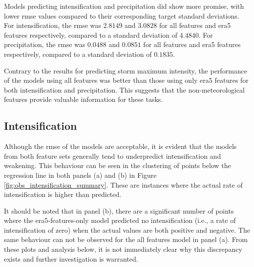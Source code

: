 Models predicting intensification and precipitation did show more promise, with lower \acrshort{rmse} values compared to their corresponding target standard deviations. For intensification, the \acrshort{rmse} was $2.8149$ and $3.0828$ for all features and \acrshort{era5} features respectively, compared to a standard deviation of $4.4840$. For precipitation, the \acrshort{rmse} was $0.0488$ and $0.0851$ for all features and \acrshort{era5} features respectively, compared to a standard deviation of $0.1835$.

Contrary to the results for predicting storm maximum intensity, the performance of the models using all features was better than those using only \acrshort{era5} features for both intensification and precipitation. This suggests that the non-meteorological features provide valuable information for these tasks.

\subsection{Intensification}
\label{sec:results-intensification}

Although the \acrshort{rmse} of the models are acceptable, it is evident that the models from both feature sets generally tend to underpredict intensification and weakening. This behaviour can be seen in the clustering of points below the regression line in both panels (a) and (b) in Figure \ref{fig:obs_intensification_summary}. These are instances where the actual rate of intensification is higher than predicted. 

It should be noted that in panel (b), there are a significant number of points where the \acrshort{era5}-features-only model predicted no intensification (i.e., a rate of intensification of zero) when the actual values are both positive and negative. The same behaviour can not be observed for the all features model in panel (a). From these plots and analysis below, it is not immediately clear why this discrepancy exists and further investigation is warranted.

